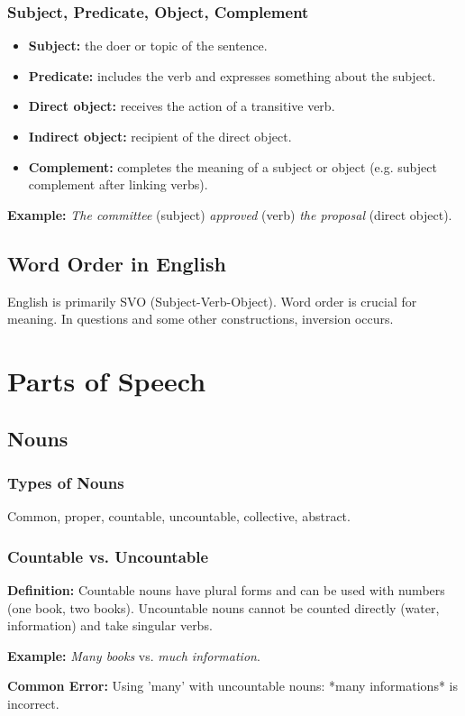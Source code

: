 \documentclass[12pt,oneside]{book}
\newcommand{\ex}[1]{\begin{examplebox}\textbf{Example:} #1\end{examplebox}}
\newcommand{\cerror}[1]{\begin{commonerr}\textbf{Common Error:} #1\end{commonerr}}
\newcommand{\defbox}[1]{\begin{definitionbox}\textbf{Definition:} #1\end{definitionbox}}
\begin{document}
\subsection{Subject, Predicate, Object, Complement}
\begin{itemize}
  \item \textbf{Subject:} the doer or topic of the sentence.\
  \item \textbf{Predicate:} includes the verb and expresses something about the subject.\
  \item \textbf{Direct object:} receives the action of a transitive verb.\
  \item \textbf{Indirect object:} recipient of the direct object.\
  \item \textbf{Complement:} completes the meaning of a subject or object (e.g. subject complement after linking verbs).\
\end{itemize}

\ex{\textit{The committee} (subject) \textit{approved} (verb) \textit{the proposal} (direct object).}

\section{Word Order in English}
English is primarily SVO (Subject-Verb-Object). Word order is crucial for meaning. In questions and some other constructions, inversion occurs.

\chapter{Parts of Speech}
\section{Nouns}
\subsection{Types of Nouns}
Common, proper, countable, uncountable, collective, abstract.

\subsection{Countable vs. Uncountable}
\defbox{Countable nouns have plural forms and can be used with numbers (one book, two books). Uncountable nouns cannot be counted directly (water, information) and take singular verbs.}

\ex{\textit{Many books} vs. \textit{much information}.}
\cerror{Using 'many' with uncountable nouns: *many informations* is incorrect.}
\end{document}
